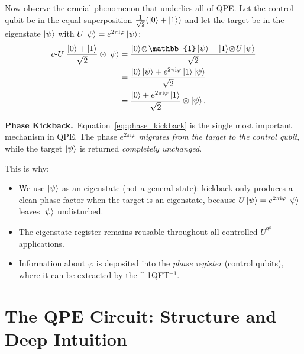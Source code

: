\documentclass[12pt,a4paper]{article}
\newcommand{\Id}{\mathbb{1}}
\newcommand{\QPE}{\textsc{QPE}}
\newcommand{\IQFT}{\ifmmode \text{\textsc{QFT}}^{-1}\else \textsc{QFT}$^{-1}$\fi}
\newcommand{\cU}{c\text{-}U}
\newcommand{\ii}{\mathrm{i}}
\begin{document}
Now observe the crucial phenomenon that underlies all of \QPE{}.
Let the control qubit be in the equal superposition
$\tfrac{1}{\sqrt{2}}(\Ket{0}+\Ket{1})$ and let the target be in the
eigenstate $\Ket{\psi}$ with $U\Ket{\psi}=e^{2\pi \ii \varphi}\Ket{\psi}$:
\begin{align}
  \cU \;\frac{\Ket{0}+\Ket{1}}{\sqrt{2}}\otimes\Ket{\psi}
  &= \frac{\Ket{0}\!\otimes\!\Id\Ket{\psi}+\Ket{1}\!\otimes\! U\Ket{\psi}}{\sqrt{2}}
  \notag \\
  &= \frac{\Ket{0}\Ket{\psi}+e^{2\pi \ii \varphi}\Ket{1}\Ket{\psi}}{\sqrt{2}}
  \notag \\
  &= \frac{\Ket{0}+e^{2\pi \ii \varphi}\Ket{1}}{\sqrt{2}}\otimes\Ket{\psi}.
  \label{eq:phase_kickback}
\end{align}

\begin{tcolorbox}[insight]
  \textbf{Phase Kickback.}\ Equation~\eqref{eq:phase_kickback} is the single
  most important mechanism in \QPE.  The phase $e^{2\pi \ii \varphi}$
  \emph{migrates from the target to the control qubit}, while the target
  $\Ket{\psi}$ is returned \emph{completely unchanged}.

  This is why:
  \begin{itemize}[leftmargin=*]
    \item We use $\Ket{\psi}$ as an eigenstate (not a general state):
      kickback only produces a clean phase factor when the target is an
      eigenstate, because $U\Ket{\psi} = e^{2\pi\ii\varphi}\Ket{\psi}$
      leaves $\Ket{\psi}$ undisturbed.
    \item The eigenstate register remains reusable throughout all
      controlled-$U^{2^k}$ applications.
    \item Information about $\varphi$ is deposited into the \emph{phase
      register} (control qubits), where it can be extracted by the \IQFT.
  \end{itemize}
\end{tcolorbox}

\newpage

\section{The QPE Circuit: Structure and Deep Intuition}
\label{sec:circuit}
\end{document}
